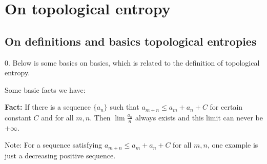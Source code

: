 \documentclass[a5paper]{article}
\begin{document}




%
%






\section{On topological entropy}




\subsection{On definitions and basics topological entropies}

0. Below is some basics on basics, which is related to the definition of topological entropy.

\twomm

Some basic facts we have:

\vspace{2mm}

{\bf Fact:} If there is a sequence $\{ a_n \}$ such that $a_{m + n} \leq a_m + a_n + C$ for certain constant $C$ and for all $m, n$. Then $\lim \frac{a_n}{n}$ always exists and this limit can never be $+ \infty$. 

\vspace{2mm}

Note: For a sequence satisfying $a_{m + n} \leq a_m + a_n + C$ for all $m, n$, one example is just a decreasing positive sequence.
\end{document}
